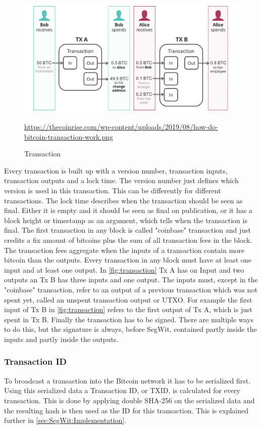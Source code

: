 \begin{figure}[!ht]
    \centering
    \includegraphics[width=(\textwidth * 2 / 3 )]{Ausarbeitung/images/transaction.png} \caption[Transaction]{Transaction}
    \small \url{https://thecoinrise.com/wp-content/uploads/2019/08/how-do-bitcoin-transaction-work.png}
    \label{fig:transaction}
\end{figure}
Every transaction is built up with a version number, transaction inputs, transaction outputs and a lock time.
The version number just defines which version is used in this transaction. This can be differently for different transactions.
The lock time describes when the transaction should be seen as final. Either it is empty and it should be seen as final on publication, or it has a block height or timestamp as an argument, which tells when the transaction is final.
The first transaction in any block is called "coinbase" transaction and just credits a fix amount of bitcoins plus the sum of all transaction fees in the block. The transaction fees aggregate when the inputs of a transaction contain more bitcoin than the outputs.
Every transaction in any block must have at least one input and at least one output. In \autoref{fig:transaction} Tx A has on Input and two outputs an Tx B has three inputs and one output. The inputs must, except in the "coinbase" transaction, refer to an output of a previous transaction which was not spent yet, called an unspent transaction output or UTXO. For example the first input of Tx B in \autoref{fig:transaction} refers to the first output of Tx A, which is just spent in Tx B.
Finally the transaction has to be signed. There are multiple ways to do this, but the signature is always, before SegWit, contained partly inside the inputs and partly inside the outputs.

\subsubsection{Transaction ID}
To broadcast a transaction into the Bitcoin network it has to be serialized first. Using this serialized data a Transaction ID, or TXID, is calculated for every transaction. This is done by applying double SHA-256 on the serialized data and the resulting hash is then used as the ID for this transaction. This is explained further in \autoref{sec:SegWit:Implementation}.


